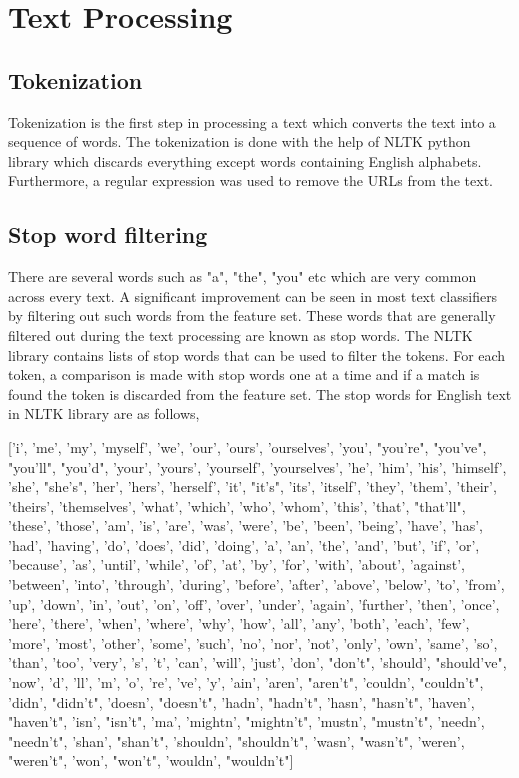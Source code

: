 \section{Text Processing}
\subsection{Tokenization}
Tokenization is the first step in processing a text which converts the text into a sequence of words. The tokenization is done with the help of NLTK\cite{loper2002nltk} python library which discards everything except words containing English alphabets. Furthermore, a regular expression was used to remove the URLs from the text.

\subsection{Stop word filtering}
There are several words such as "a", "the", "you" etc which are very common across every text. A significant improvement can be seen in most text classifiers by filtering out such words from the feature set\cite{silva2003importance}. These words that are generally filtered out during the text processing are known as stop words. The NLTK library contains lists of stop words that can be used to filter the tokens. For each token, a comparison is made with stop words one at a time and if a match is found the token is discarded from the feature set. The stop words for English text in NLTK library are as follows,

['i', 'me', 'my', 'myself', 'we', 'our', 'ours', 'ourselves', 'you', "you're", "you've", "you'll", "you'd", 'your', 'yours', 'yourself', 'yourselves', 'he', 'him', 'his', 'himself', 'she', "she's", 'her', 'hers', 'herself', 'it', "it's", 'its', 'itself', 'they', 'them', 'their', 'theirs', 'themselves', 'what', 'which', 'who', 'whom', 'this', 'that', "that'll", 'these', 'those', 'am', 'is', 'are', 'was', 'were', 'be', 'been', 'being', 'have', 'has', 'had', 'having', 'do', 'does', 'did', 'doing', 'a', 'an', 'the', 'and', 'but', 'if', 'or', 'because', 'as', 'until', 'while', 'of', 'at', 'by', 'for', 'with', 'about', 'against', 'between', 'into', 'through', 'during', 'before', 'after', 'above', 'below', 'to', 'from', 'up', 'down', 'in', 'out', 'on', 'off', 'over', 'under', 'again', 'further', 'then', 'once', 'here', 'there', 'when', 'where', 'why', 'how', 'all', 'any', 'both', 'each', 'few', 'more', 'most', 'other', 'some', 'such', 'no', 'nor', 'not', 'only', 'own', 'same', 'so', 'than', 'too', 'very', 's', 't', 'can', 'will', 'just', 'don', "don't", 'should', "should've", 'now', 'd', 'll', 'm', 'o', 're', 've', 'y', 'ain', 'aren', "aren't", 'couldn', "couldn't", 'didn', "didn't", 'doesn', "doesn't", 'hadn', "hadn't", 'hasn', "hasn't", 'haven', "haven't", 'isn', "isn't", 'ma', 'mightn', "mightn't", 'mustn', "mustn't", 'needn', "needn't", 'shan', "shan't", 'shouldn', "shouldn't", 'wasn', "wasn't", 'weren', "weren't", 'won', "won't", 'wouldn', "wouldn't"]

